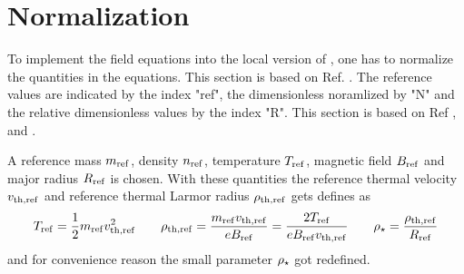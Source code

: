 \section{Normalization}
\label{sec:normalizationLocal}

To implement the field equations into the local version of \gkw, one has to normalize the quantities in the equations. This section is based on Ref. . The reference values are indicated by the index "ref", the dimensionless noramlized by "N" and the relative dimensionless values by the index "R". This section is based on Ref ,  and .
\bigskip

A reference mass $m_\mathrm{ref}$, density $n_\mathrm{ref}$, temperature $T_\mathrm{ref}$, magnetic field $B_\mathrm{ref}$ and major radius $R_\mathrm{ref}$ is chosen. With these quantities the reference thermal velocity $v_{\mathrm{th},\mathrm{ref}}$ and reference thermal Larmor radius $\rho_{\mathrm{th},\mathrm{ref}}$ gets defines as
\begin{gather*}
    T_\mathrm{ref} = \frac{1}{2} m_\mathrm{ref} v_{\mathrm{th},\mathrm{ref}}^2 \qquad \rho_{\mathrm{th},\mathrm{ref}} = \frac{m_\mathrm{ref} v_{\mathrm{th},\mathrm{ref}}}{e B_\mathrm{ref}} = \frac{2 T_\mathrm{ref}}{e B_\mathrm{ref} v_{\mathrm{th},\mathrm{ref}}} \qquad  \rho_\star = \frac{\rho_{\mathrm{th},\mathrm{ref}}}{R_\mathrm{ref}}
\end{gather*}
and for convenience reason the small parameter $\rho_\star$ got redefined.
\bigskip


